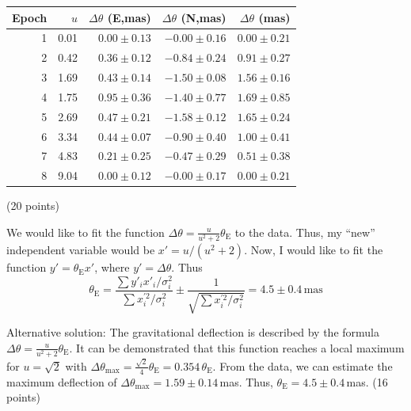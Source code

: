 \begin{description}
  \begin{center}
  \begin{tabular}{rrrrr}
  \hline\hline
  Epoch & $u$ & $\Delta\theta$ (E,mas) & $\Delta\theta$ (N,mas)
    & $\Delta\theta$ (mas)\\
  \hline
  1 & 0.01 & $0.00 \pm 0.13$ & $-0.00 \pm 0.16$ & $0.00 \pm 0.21$\\
  2 & 0.42 & $0.36 \pm 0.12$ & $-0.84 \pm 0.24$ & $0.91 \pm 0.27$\\
  3 & 1.69 & $0.43 \pm 0.14$ & $-1.50 \pm 0.08$ & $1.56 \pm 0.16$\\
  4 & 1.75 & $0.95 \pm 0.36$ & $-1.40 \pm 0.77$ & $1.69 \pm 0.85$\\
  5 & 2.69 & $0.47 \pm 0.21$ & $-1.58 \pm 0.12$ & $1.65 \pm 0.24$\\
  6 & 3.34 & $0.44 \pm 0.07$ & $-0.90 \pm 0.40$ & $1.00 \pm 0.41$\\
  7 & 4.83 & $0.21 \pm 0.25$ & $-0.47 \pm 0.29$ & $0.51 \pm 0.38$\\
  8 & 9.04 & $0.00 \pm 0.12$ & $-0.00 \pm 0.17$ & $0.00 \pm 0.21$\\
  \hline
  \end{tabular}
  \end{center}
  \hfill(20 points)

\item[(g)] We would like to fit the function
  $\Delta\theta = \frac{u}{u^2+2}\theta_{\mathrm{E}}$ to the data. Thus, my
  ``new'' independent variable would be $x' = u/(u^2+2)$. Now, I would like
  to fit the function $y' = \theta_{\mathrm{E}} x'$, where
  $y' = \Delta\theta$. Thus
  \[
    \theta_{\mathrm{E}}
    = \frac{\sum y'_i x'_i/\sigma_i^2}{\sum x_i^{\prime 2}/\sigma_i^2}
      \pm \frac{1}{\sqrt{\sum x_i^{\prime 2}/\sigma_i^2}}
    = 4.5 \pm 0.4\,\mathrm{mas}
  \]

  Alternative solution: The gravitational deflection is described by the
  formula $\Delta\theta = \frac{u}{u^2+2}\theta_{\mathrm{E}}$. It can be
  demonstrated that this function reaches a local maximum for
  $u = \sqrt{2}$ with
  $\Delta\theta_{\mathrm{max}} = \frac{\sqrt{2}}{4}\theta_{\mathrm{E}}
  = 0.354\,\theta_{\mathrm{E}}$. From the data, we can estimate the maximum
  deflection of $\Delta\theta_{\mathrm{max}} = 1.59 \pm 0.14$\,mas. Thus,
  $\theta_{\mathrm{E}} = 4.5 \pm 0.4$\,mas. \hfill(16 points)


\end{description}
